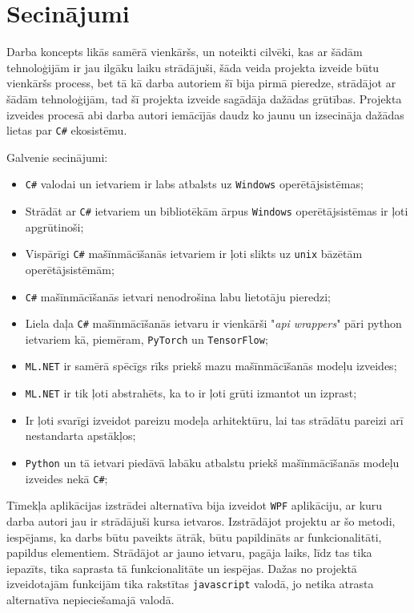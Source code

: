 \section{Secinājumi}

    Darba koncepts likās samērā vienkāršs, un noteikti cilvēki, kas ar šādām tehnoloģijām ir jau
    ilgāku laiku strādājuši, šāda veida projekta izveide būtu vienkāršs process, bet tā kā darba autoriem
    šī bija pirmā pieredze, strādājot ar šādām tehnoloģijām, tad šī projekta izveide sagādāja dažādas
    grūtības. Projekta izveides procesā abi darba autori iemācījās daudz ko jaunu  un izsecināja
    dažādas lietas par \texttt{C\#} ekosistēmu.

    Galvenie secinājumi:
    \begin{itemize}
        \item \texttt{C\#} valodai un ietvariem ir labs atbalsts uz \texttt{Windows} operētājsistēmas;
        \item Strādāt ar \texttt{C\#} ietvariem un bibliotēkām ārpus \texttt{Windows} operētājsistēmas ir ļoti apgrūtinoši;
        \item Vispārīgi \texttt{C\#} mašīnmācīšanās ietvariem ir ļoti slikts uz \texttt{unix} bāzētām operētājsistēmām;
        \item \texttt{C\#} mašīnmācīšanās ietvari nenodrošina labu lietotāju pieredzi;
        \item Liela daļa \texttt{C\#} mašīnmācīšanās ietvaru ir vienkārši "\textit{api wrappers}" pāri python ietvariem kā, piemēram, \texttt{PyTorch} un \texttt{TensorFlow};
        \item \texttt{ML.NET} ir samērā spēcīgs rīks priekš mazu mašīnmācīšanās modeļu izveides;
        \item \texttt{ML.NET} ir tik ļoti abstrahēts, ka to ir ļoti grūti izmantot un izprast;
        \item Ir ļoti svarīgi izveidot pareizu modeļa arhitektūru, lai tas strādātu pareizi arī nestandarta apstākļos;
        \item \texttt{Python} un tā ietvari piedāvā labāku atbalstu priekš mašīnmācīšanās modeļu izveides nekā \texttt{C\#};
    \end{itemize}


    \par Tīmekļa aplikācijas izstrādei alternatīva bija izveidot \texttt{WPF} aplikāciju, ar kuru darba autori jau ir strādājuši kursa ietvaros. Izstrādājot projektu ar šo metodi, iespējams, ka darbs būtu paveikts ātrāk, būtu papildināts ar funkcionalitāti, papildus elementiem. Strādājot ar jauno ietvaru, pagāja laiks, līdz tas tika iepazīts, tika saprasta tā funkcionalitāte un iespējas. Dažas no projektā izveidotajām funkcijām tika rakstītas \texttt{javascript} valodā, jo netika atrasta alternatīva nepieciešamajā valodā.
